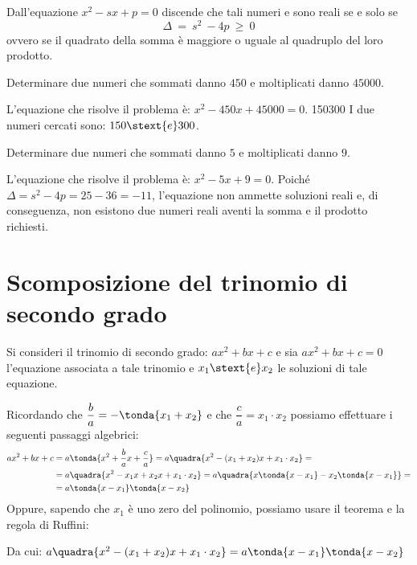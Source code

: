 Dall'equazione \(x^2 -s x +p = 0\) discende che tali numeri e sono 
reali se e solo se 
\[\Delta~=~s^{2}~-4p~\geq~0\] 
ovvero se il quadrato della somma è maggiore o uguale al quadruplo del loro 
prodotto.

\begin{esempio}
Determinare due numeri che sommati danno \(450\) e moltiplicati danno \(45000\).

L'equazione che risolve il problema è: \(x^2 -450 x +45000 = 0\). 
         {150}{300}
I due numeri cercati sono: \(150 \stext{e} 300\).
\end{esempio}

\begin{esempio}
Determinare due numeri che sommati danno \(5\) e moltiplicati danno \(9\).

L'equazione che risolve il problema è: \(x^2 -5x +9 = 0\). 
Poiché \(\Delta = s^{2} -4 p = 25 -36 = -11\), l'equazione non ammette 
soluzioni reali e, di conseguenza, non esistono due numeri reali aventi la 
somma e il prodotto richiesti.
\end{esempio}

\section{Scomposizione del trinomio di secondo grado}
\label{sec:eq2gr_scomposizione_trinomio}

Si consideri il trinomio di secondo grado: \(a x^2 +b x +c\) e sia 
\(a x^2 + b x +c = 0\) l'equazione associata a tale trinomio e 
\(x_1 \stext{e} x_2\) le soluzioni di tale equazione. 

Ricordando che \(\dfrac{b}{a} = - \tonda{x_1 +x_2}\) e che 
\(\dfrac{c}{a} = x_1  \cdot x_2\) possiamo effettuare i seguenti passaggi 
algebrici:
\begin{align*}
a x^2 +b x +c &= 
  a \tonda{x^2 +\dfrac{b}{a} x +\dfrac{c}{a}}=
  a \quadra{x^2 -(x_1 +x_2) x +x_1 \cdot x_2}=\\
  &=a \quadra{x^2 -x_1 x +x_2 x +x_1 \cdot x_2}=
  a \quadra{x \tonda{x -x_1} -x_2 \tonda{x -x_1}}=\\
  &=a \tonda{x -x_1} \tonda{x -x_2}
 \end{align*}
{Oppure, sapendo che \(x_1\) è uno zero del polinomio, possiamo usare il 
teorema e la regola di Ruffini:}
{\begin{center}
\end{center}}
Da cui: \(a \quadra{x^2 -(x_1 +x_2) x +x_1 \cdot x_2}=
          a \tonda{x -x_1} \tonda{x -x_2}\)

